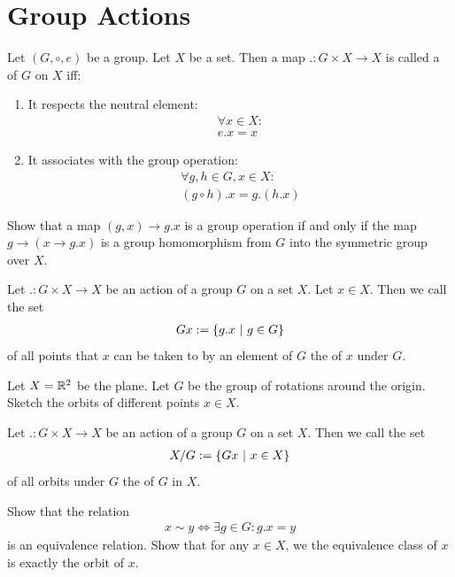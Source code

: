 \section{Group Actions}
\begin{importantdefinition}{}{}
	Let $(G, \circ, e)$ be a group. Let $X$ be a set. Then a map $. : G \times X \to X$ is called a  of $G$ on $X$ iff:
	\begin{enumerate}
		\item It respects the neutral element:
		\begin{align*}
			\forall x \in X:\\
			e.x = x
		\end{align*}
		\item It associates with the group operation:
		\begin{align*}
			\forall g,h \in G, x \in X:\\
			(g \circ h).x = g.(h.x)
		\end{align*}
	\end{enumerate}
\end{importantdefinition}
\begin{exercise}
	Show that a map $(g,x) \to g.x$ is a group operation if and only if the map $g \to (x \to g.x)$ is a group homomorphism from $G$ into the symmetric group over $X$.
\end{exercise}
\begin{definition}
	Let $. : G \times X \to X$ be an action of a group $G$ on a set $X$. Let $x \in X$. Then we call the set
	\begin{align*}
		Gx := \qty{g.x ~\middle|~g \in G}
	\end{align*}
	of all points that $x$ can be taken to by an element of $G$ the  of $x$ under $G$.
\end{definition}
\begin{exercise}
	Let $X = \mathbb{R}^2$ be the plane. Let $G$ be the group of rotations around the origin. Sketch the orbits of different points $x \in X$.
\end{exercise}
\begin{definition}
	Let $. : G \times X \to X$ be an action of a group $G$ on a set $X$. Then we call the set
	\begin{align*}
		X/G := \qty{Gx ~\middle|~x \in X}
	\end{align*}
	of all orbits under $G$ the  of $G$ in $X$.
\end{definition}
\begin{exercise}
	Show that the relation
	\begin{align*}
		x \sim y \Leftrightarrow \exists g \in G : g.x = y
	\end{align*}
	is an equivalence relation. Show that for any $x \in X$, we the equivalence class of $x$ is exactly the orbit of $x$.
\end{exercise}
